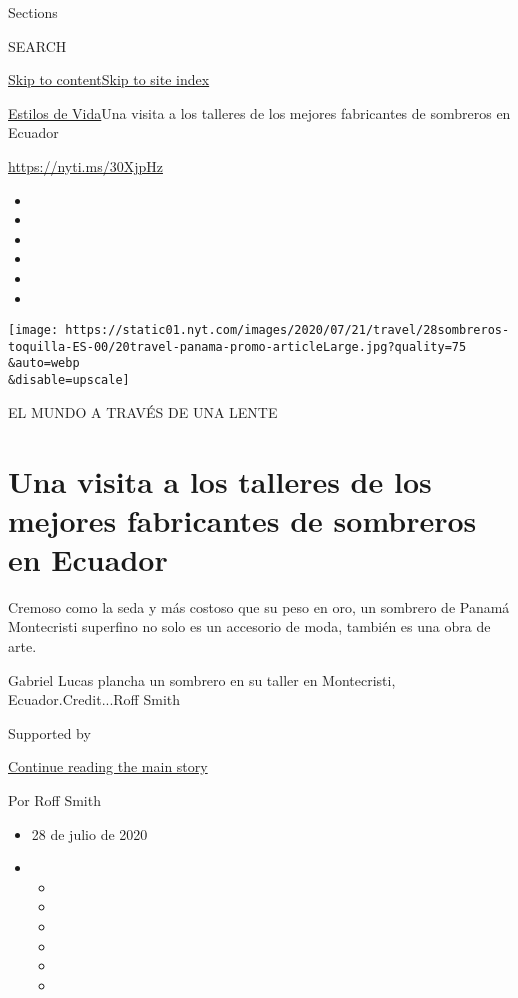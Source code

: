 Sections

SEARCH

\protect\hyperlink{site-content}{Skip to
content}\protect\hyperlink{site-index}{Skip to site index}

\href{/es/section/estilos-de-vida}{Estilos de Vida}\textbar{}Una visita
a los talleres de los mejores fabricantes de sombreros en Ecuador

\url{https://nyti.ms/30XjpHz}

\begin{itemize}
\item
\item
\item
\item
\item
\item
\end{itemize}

\texttt{[image: https://static01.nyt.com/images/2020/07/21/travel/28sombreros-toquilla-ES-00/20travel-panama-promo-articleLarge.jpg?quality=75\\\&auto=webp\\\&disable=upscale]}

EL MUNDO A TRAVÉS DE UNA LENTE

\hypertarget{una-visita-a-los-talleres-de-los-mejores-fabricantes-de-sombreros-en-ecuador}{%
\section{Una visita a los talleres de los mejores fabricantes de
sombreros en
Ecuador}\label{una-visita-a-los-talleres-de-los-mejores-fabricantes-de-sombreros-en-ecuador}}

Cremoso como la seda y más costoso que su peso en oro, un sombrero de
Panamá Montecristi superfino no solo es un accesorio de moda, también es
una obra de arte.

Gabriel Lucas plancha un sombrero en su taller en Montecristi,
Ecuador.Credit...Roff Smith

Supported by

\protect\hyperlink{after-sponsor}{Continue reading the main story}

Por Roff Smith

\begin{itemize}
\item
  28 de julio de 2020
\item
  \begin{itemize}
  \item
  \item
  \item
  \item
  \item
  \item
  \end{itemize}
\end{itemize}

